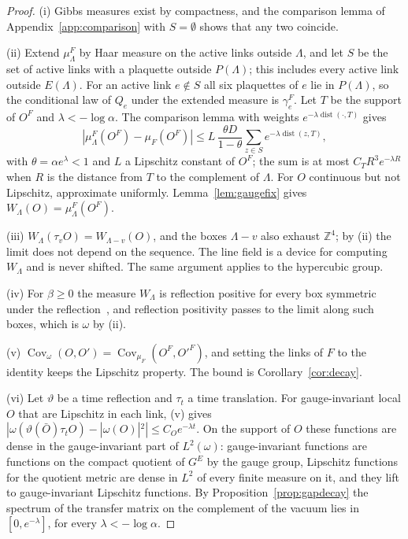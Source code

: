\documentclass[aps,prd,twocolumn,superscriptaddress,nofootinbib,longbibliography,floatfix,amsmath,amssymb,10pt]{revtex4-2}
\theoremstyle{definition}
\theoremstyle{remark}
\newcommand{\Z}{\mathbb{Z}}
\newcommand{\Cov}{\operatorname{Cov}}
\newcommand{\dist}{\operatorname{dist}}
\begin{document}
\begin{proof}
(i) Gibbs measures exist by compactness, and the comparison lemma of
Appendix~\ref{app:comparison} with $S=\emptyset$ shows that any two coincide.

(ii) Extend $\mu^F_\Lambda$ by Haar measure on the active links outside
$\Lambda$, and let $S$ be the set of active links with a plaquette outside
$P(\Lambda)$; this includes every active link outside $E(\Lambda)$. For an
active link $e\notin S$ all six plaquettes of $e$ lie in $P(\Lambda)$, so the
conditional law of $Q_e$ under the extended measure is $\gamma^F_e$. Let $T$
be the support of $O^F$ and $\lambda<-\log\alpha$. The comparison lemma with
weights $e^{-\lambda\dist(\cdot,T)}$ gives
\[
|\mu^F_\Lambda(O^F)-\mu_F(O^F)|\le L\,\frac{\theta D}{1-\theta}
\sum_{z\in S}e^{-\lambda\dist(z,T)},
\]
with $\theta=\alpha e^\lambda<1$ and $L$ a Lipschitz constant of $O^F$; the
sum is at most $C_TR^3e^{-\lambda R}$ when $R$ is the distance from $T$ to the
complement of $\Lambda$. For $O$ continuous but not Lipschitz, approximate
uniformly. Lemma~\ref{lem:gaugefix} gives $W_\Lambda(O)=\mu^F_\Lambda(O^F)$.

(iii) $W_\Lambda(\tau_vO)=W_{\Lambda-v}(O)$, and the boxes $\Lambda-v$ also
exhaust $\Z^4$; by (ii) the limit does not depend on the sequence. The line
field is a device for computing $W_\Lambda$ and is never shifted. The same
argument applies to the hypercubic group.

(iv) For $\beta\ge0$ the measure $W_\Lambda$ is reflection positive for every
box symmetric under the reflection~\cite{OSei78}, and reflection positivity
passes to the limit along such boxes, which is $\omega$ by (ii).

(v) $\Cov_\omega(O,O')=\Cov_{\mu_F}(O^F,O'^F)$, and setting the links of $F$
to the identity keeps the Lipschitz property. The bound is
Corollary~\ref{cor:decay}.

(vi) Let $\vartheta$ be a time reflection and $\tau_t$ a time translation.
For gauge-invariant local $O$ that are Lipschitz in each link, (v) gives
$|\omega(\vartheta(\bar O)\tau_tO)-|\omega(O)|^2|\le C_Oe^{-\lambda t}$. On
the support of $O$ these functions are dense in the gauge-invariant part of
$L^2(\omega)$: gauge-invariant functions are functions on the compact
quotient of $G^{E}$ by the gauge group, Lipschitz functions for the quotient
metric are dense in $L^2$ of every finite measure on it, and they lift to
gauge-invariant Lipschitz functions. By Proposition~\ref{prop:gapdecay} the spectrum
of the transfer matrix on the complement of the vacuum lies in
$[0,e^{-\lambda}]$, for every $\lambda<-\log\alpha$.
\end{proof}
\end{document}
